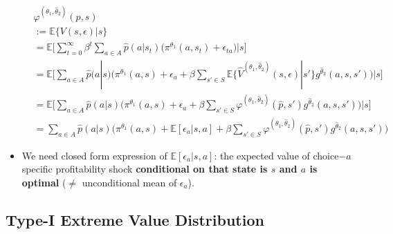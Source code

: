 \documentclass[]{book}
\begin{document}
\begin{itemize}
  \begin{equation}
  \begin{split}
  &\varphi^{(\theta_1, \hat{\theta}_2)}(p, s)\\
  &:= \mathbb{E}\{V(s, \epsilon)|s\}\\
  &= \mathbb{E}\Bigg[ \sum_{t = 0}^\infty \beta^t \sum_{a \in A}\hat{p}(a|s_t)\Bigg(\pi^{\theta_1}(a, s_t) + \epsilon_{ta}\Bigg)\Bigg|s\Bigg]\\
  &=\mathbb{E}\Bigg[\sum_{a \in A}\hat{p}(a|s)\Bigg(\pi^{\theta_1}(a, s) + \epsilon_{a} + \beta \sum_{s' \in S} \mathbb{E}\{\hat{V}^{(\theta_1, \hat{\theta}_2)}(s, \epsilon)|s'\} g^{\hat{\theta}_2}(a, s, s')  \Bigg)\Bigg|s\Bigg]\\
  &=\mathbb{E}\Bigg[\sum_{a \in A}\hat{p}(a|s)\Bigg(\pi^{\theta_1}(a, s) + \epsilon_{a} + \beta \sum_{s' \in S} \varphi^{(\theta_1, \hat{\theta}_2)}(\hat{p}, s') g^{\hat{\theta}_2}(a, s, s')  \Bigg)\Bigg|s\Bigg]\\
  &=\sum_{a \in A}\hat{p}(a|s)\Bigg(\pi^{\theta_1}(a, s) + \mathbb{E}[\epsilon_{a}|s, a] + \beta \sum_{s' \in S} \varphi^{(\theta_1, \hat{\theta}_2)}(\hat{p}, s') g^{\hat{\theta}_2}(a, s, s')  \Bigg)
  \end{split}
  \end{equation}
\item
  We need closed form expression of \(\mathbb{E}[\epsilon_{a}|s, a]\):
  the expected value of choice\(-a\) specific profitability shock
  \textbf{conditional on that state is \(s\) and \(a\) is optimal}
  (\(\neq\) unconditional mean of \(\epsilon_a\)).
\end{itemize}

\subsection{Type-I Extreme Value
Distribution}\label{type-i-extreme-value-distribution-1}
\end{document}
